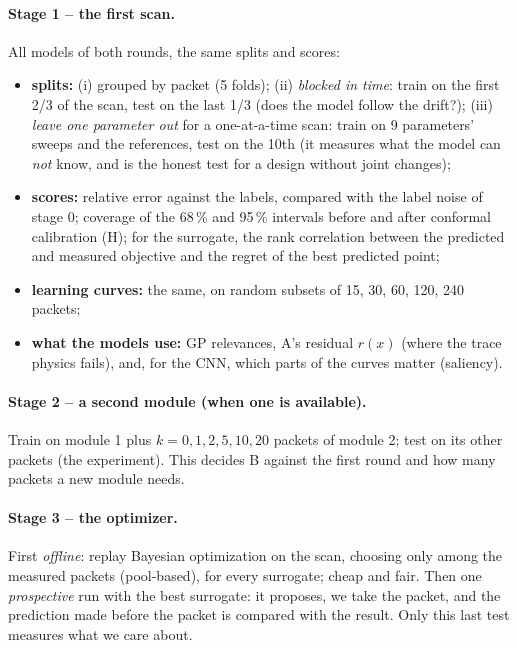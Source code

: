 \paragraph{Stage 1 -- the first scan.} All models of both rounds, the same splits and scores:
\begin{itemize}
\item \textbf{splits:} (i) grouped by packet (5 folds); (ii) \emph{blocked in time}: train on the first 2/3 of the scan, test on the last
  1/3 (does the model follow the drift?); (iii) \emph{leave one parameter out} for a one-at-a-time scan: train on 9 parameters' sweeps
  and the references, test on the 10th (it measures what the model can \emph{not} know, and is the honest test for a design without joint
  changes);
\item \textbf{scores:} relative error against the labels, compared with the label noise of stage 0; coverage of the 68\,\% and 95\,\%
  intervals before and after conformal calibration (H); for the surrogate, the rank correlation between the predicted and measured
  objective and the regret of the best predicted point;
\item \textbf{learning curves:} the same, on random subsets of 15, 30, 60, 120, 240 packets;
\item \textbf{what the models use:} GP relevances, A's residual $r(x)$ (where the trace physics fails), and, for the CNN, which parts of the
  curves matter (saliency).
\end{itemize}

\paragraph{Stage 2 -- a second module (when one is available).} Train on module 1 plus $k = 0, 1, 2, 5, 10, 20$ packets of module 2;
test on its other packets (the  experiment). This decides B against the first round and how many packets a new module needs.

\paragraph{Stage 3 -- the optimizer.} First \emph{offline}: replay Bayesian optimization on the scan, choosing only among the measured
packets (pool-based), for every surrogate; cheap and fair. Then one \emph{prospective} run with the best surrogate: it proposes, we take the
packet, and the prediction made before the packet is compared with the result. Only this last test measures what we care about.

